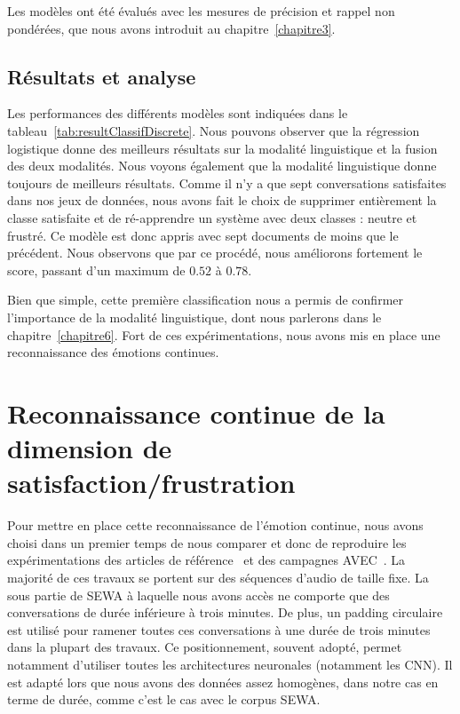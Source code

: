 Les modèles ont été évalués avec les mesures de précision et rappel non pondérées, que nous avons introduit au chapitre~\ref{chapitre3}.

\subsection{Résultats et analyse}



Les  performances des différents modèles sont indiquées dans le tableau~\ref{tab:resultClassifDiscrete}. Nous pouvons observer que la régression logistique donne des meilleurs résultats sur la modalité linguistique et la fusion des deux modalités. Nous voyons également que la modalité linguistique donne toujours de meilleurs résultats. Comme il n'y a que sept conversations satisfaites dans nos jeux de données, nous avons fait le choix de supprimer entièrement la classe satisfaite et de ré-apprendre un système avec deux classes : neutre et frustré. Ce modèle est donc appris avec sept documents de moins que le précédent. Nous observons que par ce procédé, nous améliorons fortement le score, passant d'un maximum de $0.52$ à $0.78$.

Bien que simple, cette première classification nous a permis de confirmer l'importance de la modalité linguistique, dont nous parlerons dans le chapitre~\ref{chapitre6}. Fort de ces expérimentations, nous avons mis en place une reconnaissance des émotions continues.

\section{Reconnaissance continue de la dimension de satisfaction/frustration}
Pour mettre en place cette reconnaissance de l'émotion continue, nous avons choisi dans un premier temps de nous comparer et donc de reproduire les expérimentations des articles de référence~\cite{Schmitt2019,SEWA} et des campagnes AVEC~\cite{AVEC2017,AVEC2018,AVEC2019}. La majorité de ces travaux se portent sur des séquences d'audio de taille fixe. La sous partie de SEWA à laquelle nous avons accès ne comporte que des conversations de durée inférieure à trois minutes. De plus, un padding circulaire est utilisé pour ramener toutes ces conversations à une durée de trois minutes dans la plupart des travaux. Ce positionnement, souvent adopté, permet notamment d'utiliser toutes les architectures neuronales (notamment les CNN). Il est adapté lors que nous avons des données assez homogènes, dans notre cas en terme de durée, comme c'est le cas avec le corpus SEWA.


